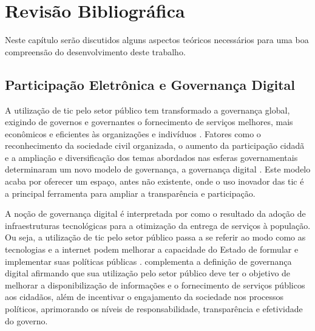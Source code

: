 \chapter[Revisão Bibliográfica]{Revisão Bibliográfica} 
\label{cap:cap2}

Neste capítulo serão discutidos alguns aspectos teóricos necessários para uma boa compreensão do desenvolvimento deste trabalho.

\section{Participação Eletrônica e Governança Digital}
\label{sec:e-part}
\par
A utilização de \acrshort{tic} pelo setor público tem transformado a governança global, exigindo de governos e governantes o fornecimento de serviços melhores, 
mais econômicos e eficientes às organizações e indivíduos \cite{afdb2014uneca}. Fatores como o reconhecimento da sociedade civil organizada, o aumento da participação cidadã e a 
ampliação e diversificação dos temas abordados nas esferas governamentais determinaram um novo modelo de governança, a governança digital \cite{o2011government}. 
Este modelo acaba por oferecer um espaço, antes não existente, onde o uso inovador das \acrshort{tic} é a principal ferramenta para ampliar a transparência e participação.

\par
A noção de governança digital é interpretada por  como o resultado da adoção de infraestruturas tecnológicas para a otimização da entrega de 
serviços à população. Ou seja, a utilização de \acrshort{tic} pelo setor público passa a se referir ao modo como as tecnologias e a internet podem melhorar a capacidade do Estado 
de formular e implementar suas políticas públicas \cite{parra2017governancca}.  complementa a definição de governança digital afirmando que sua 
utilização pelo setor público deve ter o objetivo de melhorar a disponibilização de informações e o fornecimento de serviços públicos aos cidadãos, 
além de incentivar o engajamento da sociedade nos processos políticos, aprimorando os níveis de responsabilidade, transparência e efetividade do governo.

